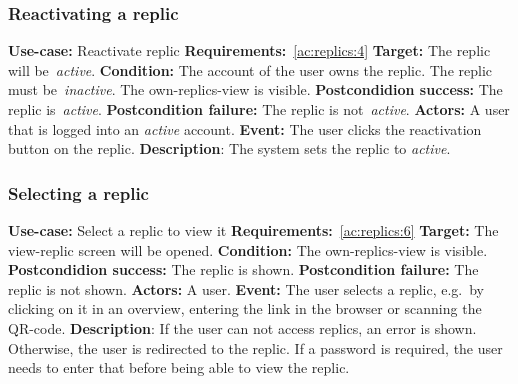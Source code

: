 \subsubsection{Reactivating a replic}\label{subsubsec:reactivate-replic}
\textbf{Use-case:} Reactivate replic \newline
\textbf{Requirements:}~\ref{ac:replics:4} \newline
\textbf{Target:} The replic will be~\textit{active}. \newline
\textbf{Condition:} The account of the user owns the replic.
The replic must be~\textit{inactive}.
The own-replics-view is visible. \newline
\textbf{Postcondidion success:} The replic is~\textit{active}. \newline
\textbf{Postcondition failure:} The replic is not~\textit{active}. \newline
\textbf{Actors:} A user that is logged into an \textit{active} account. \newline
\textbf{Event:} The user clicks the reactivation button on the replic. \newline
\textbf{Description}: The system sets the replic to \textit{active}.

\subsubsection{Selecting a replic}\label{subsubsec:select-replic}
\textbf{Use-case:} Select a replic to view it \newline
\textbf{Requirements:}~\ref{ac:replics:6} \newline
\textbf{Target:} The view-replic screen will be opened. \newline
\textbf{Condition:} The own-replics-view is visible. \newline
\textbf{Postcondidion success:} The replic is shown. \newline
\textbf{Postcondition failure:} The replic is not shown. \newline
\textbf{Actors:} A user. \newline
\textbf{Event:} The user selects a replic, e.g.\ by clicking on it in an overview, entering the link in the browser or scanning the QR-code. \newline
\textbf{Description}: If the user can not access replics, an error is shown.
Otherwise, the user is redirected to the replic.
If a password is required, the user needs to enter that before being able to view the replic.

